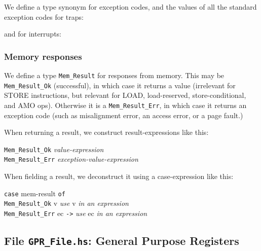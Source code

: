 \documentclass[11pt]{article}
\newcommand{\hm}{\hspace*{1em}}
\newcommand{\hmmm}{\hspace*{3em}}
\begin{document}
We define a type synonym for exception codes, and the values of all
the standard exception codes for traps:



and for interrupts:




\subsubsection{Memory responses}

\label{sec_mem_responses}

We define a type {\tt Mem\_Result} for responses from memory.  This
may be {\tt Mem\_Result\_Ok} (successful), in which case it returns a
value (irrelevant for STORE instructions, but relevant for LOAD,
load-reserved, store-conditional, and AMO ops).  Otherwise it is a
{\tt Mem\_Result\_Err}, in which case it returns an exception code
(such as misalignment error, an access error, or a page fault.)



When returning a result, we construct result-expressions like this:
\begin{tabbing}
\hmmm \= {\tt Mem\_Result\_Ok} \hm \= \emph{value-expression} \\
      \> {\tt Mem\_Result\_Err}    \> \emph{exception-value-expression}
\end{tabbing}

When fielding a result, we deconstruct it using a case-expression like this:
\begin{tabbing}
\hmmm \= {\tt case} mem-result {\tt of} \\
      \> \hm \= {\tt Mem\_Result\_Ok} v \hm {\tt ->} \= \emph{use} v \emph{in an expression} \\
      \>     \> {\tt Mem\_Result\_Err} ec   {\tt ->} \> \emph{use} ec \emph{in an expression}
\end{tabbing}


\subsection{File {\tt GPR\_File.hs}: General Purpose Registers}

\label{sec_gprs}
\end{document}

